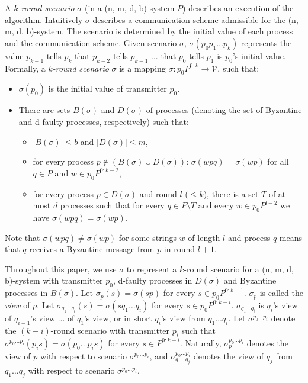 \documentclass[11pt,conference,compsoc,onecolumn,romanappendices]{IEEEtran}
\newcommand{\nin}{\not\in}
\newcommand{\tmem}[1]{{\em #1\/}}
\begin{document}
A {\tmem{$k$-round scenario}} $\sigma$ (in a (n, m, d, b)-system $P$)
describes an execution of the algorithm. Intuitively $\sigma$ describes a
communication scheme admissible for the (n, m, d, b)-system. The scenario 
is determined by the
initial value of each process and the communication scheme.
Given scenario $\sigma$,
$\sigma (p_0 p_1 \ldots p_k)$ represents the value $p_{k - 1}$
tells $p_k$ that $p_{k - 2}$ tells $p_{k - 1}$ ... that $p_0$ tells $p_1$ is
$p_0$'s initial value.
Formally, a {\tmem{$k$-round scenario}} $\sigma$ is a mapping $\sigma : p_0
P^{0 : k} \rightarrow \mathcal{V}$, such that:
\begin{itemize}
  \item $\sigma (p_0)$ is the initial value of transmitter $p_0$.
  \smallskip
  
  \item There are sets $B (\sigma)$ and $D (\sigma)$ of processes (denoting
  the set of Byzantine and d-faulty processes, respectively) such
  that:
  \begin{itemize}\itemsep0em
    \item $|B (\sigma) | \leqslant b$ and $| D (\sigma) | \leqslant m$,
    
    \item for every process $p \nin (B (\sigma) \cup D (\sigma))$: $\sigma
    (wpq) = \sigma (wp)$ for all $q \in P$ and $w \in p_0 P^{0 : k - 2}$,
  
    \item 
     for every process $p \in D(\sigma)$ and round $l$ ($\leqslant k$), there is a set $T$ of at most $d$ processes such that for
    every $q \in P \setminus T$ and every $w \in p_0 P^{l - 2}$ we have
    $\sigma (wpq) = \sigma (wp)$.
  \end{itemize}
\end{itemize}
Note that $\sigma (wpq) \neq \sigma (wp)$ for some strings $w$ of length
$l$ and process $q$ means that $q$ receives a Byzantine message from $p$ in round $l +
1$.

Throughout this paper, we use $\sigma$ to represent a $k$-round scenario for
a (n, m, d, b)-system with transmitter $p_0$, d-faulty processes in $D
(\sigma)$ and Byzantine processes in $B (\sigma)$. Let $\sigma_p (s) = \sigma (s
p)$ for every $s \in p_0 P^{0 : k-1}$. $\sigma_p$ is called the \tmem{view} of $p$. Let $\sigma_{q_1 \ldots q_i} (s) =
\sigma (s q_1 \ldots q_i)$ for every $s \in p_0 P^{0 : k-i}$. $\sigma_{q_1 \ldots q_i}$ is $q_i$'s view of $q_{i
- 1}$'s view ... of $q_1$'s view, or in short $q_i$'s view from $q_1 \ldots
q_i$. Let $\sigma^{p_0 \ldots p_i}$ denote the $(k - i)$-round scenario with transmitter
$p_i$ such that $\sigma^{p_0 \ldots p_i} (p_i s) =
\sigma (p_0 \ldots p_i s)$ for every $s \in P^{0 : k-i}$.
Naturally, $\sigma^{p_0 \ldots p_i}_p$ denotes the view of $p$ with respect
to scenario $\sigma^{p_0 \ldots p_i}$, and $\sigma^{p_0 \ldots p_i}_{q_{1} \ldots
q_j}$ denotes the view of $q_j$ from $q_{1} \ldots q_j$ with respect to
scenario $\sigma^{p_0 \ldots p_i}$.
\end{document}
